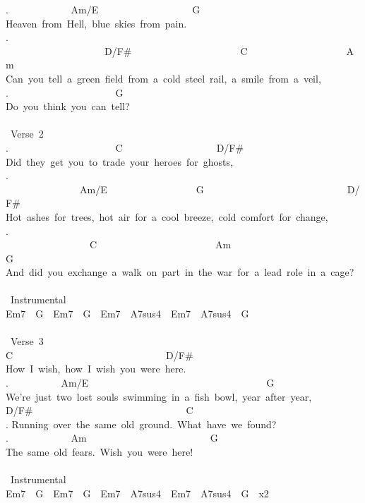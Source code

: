 {. \ \ \ \ \ \ \ \ \ \ \ \ Am/E\ \ \ \ \ \ \ \ \ \ \ \ \ \ \ \ \ \ \ G\\
Heaven\ from\ Hell,\ blue\ skies\ from\ pain.\\
. \ \ \ \ \ \ \ \ \ \ \ \ \ \ \ \ \ \ \ \ D/F\#\ \ \ \ \ \ \ \ \ \ \ \ \ \ \ \ \ \ \ \ \ \ C\ \ \ \ \ \ \ \ \ \ \ \ \ \ \ \ \ \ \ \ Am\\
Can\ you\ tell\ a\ green\ field\ from\ a\ cold\ steel\ rail,\ a\ smile\ from\ a\ veil,\\
. \ \ \ \ \ \ \ \ \ \ \ \ \ \ \ \ \ \ \ \ \ G\\
Do\ you\ think\ you\ can\ tell?\\
\\
\lbrack\ Verse\ 2\rbrack\\
. \ \ \ \ \ \ \ \ \ \ \ \ \ \ \ \ \ \ \ \ \ C\ \ \ \ \ \ \ \ \ \ \ \ \ \ \ \ \ \ \ D/F\#\\
Did\ they\ get\ you\ to\ trade\ your\ heroes\ for\ ghosts,\\
. \ \ \ \ \ \ \ \ \ \ \ \ \ \ \ Am/E\ \ \ \ \ \ \ \ \ \ \ \ \ \ \ \ \ \ G\ \ \ \ \ \ \ \ \ \ \ \ \ \ \ \ \ \ \ \ \ \ \ \ \ \ \ \ \ D/F\#\\
Hot\ ashes\ for\ trees,\ hot\ air\ for\ a\ cool\ breeze,\ cold\ comfort\ for\ change,\\
. \ \ \ \ \ \ \ \ \ \ \ \ \ \ \ \ \ C\ \ \ \ \ \ \ \ \ \ \ \ \ \ \ \ \ \ \ \ \ \ \ \ Am\ \ \ \ \ \ \ \ \ \ \ \ \ \ \ \ \ \ \ \ \ \ \ \ \ G\\
And\ did\ you\ exchange\ a\ walk\ on\ part\ in\ the\ war\ for\ a\ lead\ role\ in\ a\ cage?\\
\\
\lbrack\ Instrumental\rbrack\\
Em7\ \ G\ \ Em7\ \ G\ \ Em7\ \ A7sus4\ \ Em7\ \ A7sus4\ \ G\\
\\
\lbrack\ Verse\ 3\rbrack\\
C\ \ \ \ \ \ \ \ \ \ \ \ \ \ \ \ \ \ \ \ \ \ \ \ \ \ \ \ \ \ \ D/F\#\\
How\ I\ wish,\ how\ I\ wish\ you\ were\ here.\\
. \ \ \ \ \ \ \ \ \ \ Am/E\ \ \ \ \ \ \ \ \ \ \ \ \ \ \ \ \ \ \ \ \ \ \ \ \ \ \ \ \ \ \ \ \ \ \ \ G\ \ \ \ \ \ \ \ \ \ \ \ \ \ \ \ \\
We're\ just\ two\ lost\ souls\ swimming\ in\ a\ fish\ bowl,\ year\ after\ year,\\
D/F\#\ \ \ \ \ \ \ \ \ \ \ \ \ \ \ \ \ \ \ \ \ \ \ \ \ \ \ \ \ \ \ C\\
. Running\ over\ the\ same\ old\ ground.\ What\ have\ we\ found?\\
. \ \ \ \ \ \ \ \ \ \ \ \ Am\ \ \ \ \ \ \ \ \ \ \ \ \ \ \ \ \ \ \ \ \ \ \ \ \ G\\
The\ same\ old\ fears.\ Wish\ you\ were\ here!\\
\\
\lbrack\ Instrumental\rbrack\\
Em7\ \ G\ \ Em7\ \ G\ \ Em7\ \ A7sus4\ \ Em7\ \ A7sus4\ \ G\ \ x2\ }
